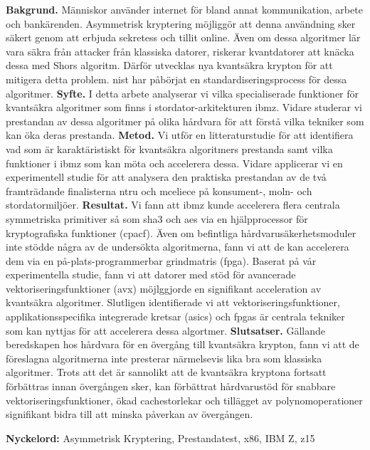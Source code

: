 \sammanfattning
\noindent
\textbf{Bakgrund.} Människor använder internet för bland annat kommunikation, arbete och bankärenden. Asymmetrisk kryptering möjliggör att denna användning sker säkert genom att erbjuda sekretess och tillit online. Även om dessa algoritmer lär vara säkra från attacker från klassiska datorer, riskerar kvantdatorer att knäcka dessa med Shors algoritm. Därför utvecklas nya kvantsäkra krypton för att mitigera detta problem. \acrfull{nist} har påbörjat en standardiseringsprocess för dessa algoritmer.\newline
\textbf{Syfte.} I detta arbete analyserar vi vilka specialiserade funktioner för kvantsäkra algoritmer som finns i stordator-arkitekturen \gls{ibmz}. Vidare studerar vi prestandan av dessa algoritmer på olika hårdvara för att förstå vilka tekniker som kan öka deras prestanda.\newline
\textbf{Metod.} Vi utför en litteraturstudie för att identifiera vad som är karaktäristiskt för kvantsäkra algoritmers prestanda samt vilka funktioner i \gls{ibmz} som kan möta och accelerera dessa. Vidare applicerar vi en experimentell studie för att analysera den praktiska prestandan av de två framträdande finalisterna \gls{ntru} och \gls{mceliece} på konsument-, moln- och stordatormiljöer.\newline
\textbf{Resultat.} Vi fann att \gls{ibmz} kunde accelerera flera centrala symmetriska primitiver så som \gls{sha3} och \gls{aes} via en hjälpprocessor för kryptografiska funktioner (\acrshort{cpacf}). Även om befintliga hårdvarusäkerhetsmoduler inte stödde några av de undersökta algoritmerna, fann vi att de kan accelerera dem via en på-plats-programmerbar grindmatris (\acrshort{fpga}). Baserat på vår experimentella studie, fann vi att datorer med stöd för avancerade vektoriseringsfunktioner (\gls{avx}) möjlggjorde en signifikant acceleration av kvantsäkra algoritmer. Slutligen identifierade vi att vektoriseringsfunktioner, applikationsspecifika integrerade kretsar (\acrshort{asic}s) och \acrshort{fpga}s är centrala tekniker som kan nyttjas för att accelerera dessa algortmer.\newline
\textbf{Slutsatser.} Gällande beredskapen hos hårdvara för en övergång till kvantsäkra krypton, fann vi att de föreslagna algoritmerna inte presterar närmelsevis lika bra som klassiska algoritmer. Trots att det är sannolikt att de kvantsäkra kryptona fortsatt förbättras innan övergången sker, kan förbättrat hårdvarustöd för snabbare vektoriseringsfunktioner, ökad cachestorlekar och tillägget av polynomoperationer signifikant bidra till att minska påverkan av övergången.

\vspace{1cm}
\noindent
\textbf{Nyckelord:} Asymmetrisk Kryptering, Prestandatest, x86, IBM Z, z15

\cleardoublepage
